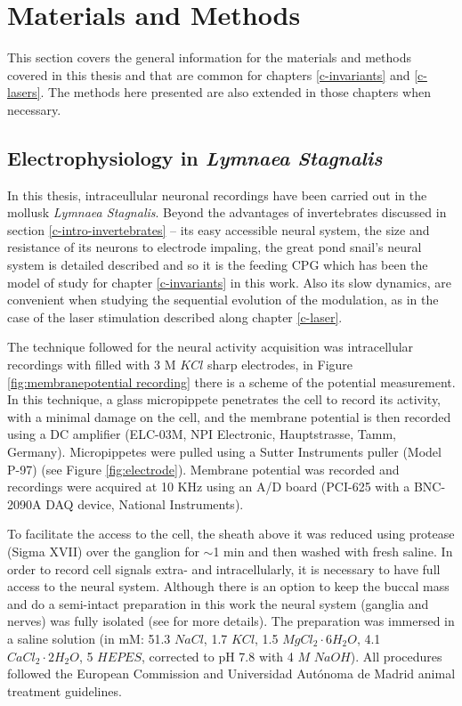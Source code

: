 \chapter{Materials and Methods}
This section covers the general information for the materials and methods covered in this thesis and that are common for chapters \ref{c-invariants} and \ref{c-lasers}. The methods here presented are also extended in those chapters when necessary.

\section{Electrophysiology in \textit{Lymnaea Stagnalis}}

\label{subsec:preparation}
In this thesis, intraceullular neuronal recordings have been carried out in the mollusk \textit{Lymnaea Stagnalis}. Beyond the advantages of invertebrates discussed in section \ref{c-intro-invertebrates} -- its easy accessible neural system, the size and resistance of its neurons to electrode impaling, the great pond snail's neural system is detailed described and so it is the feeding CPG which has been the model of study for chapter \ref{c-invariants} in this work. Also its slow dynamics, are convenient when studying the sequential evolution of the modulation, as in the case of the laser stimulation described along chapter \ref{c-laser}. 

The technique followed for the neural activity acquisition was intracellular recordings with filled with 3 M $KCl$ sharp electrodes, in Figure \ref{fig:membranepotential recording} there is a scheme of the potential measurement. In this technique, a glass micropippete penetrates the cell to record its activity, with a minimal damage on the cell, and the membrane potential is then recorded using a DC amplifier (ELC-03M, NPI Electronic, Hauptstrasse, Tamm, Germany). Micropippetes were pulled using a Sutter Instruments puller (Model P-97) (see Figure \ref{fig:electrode}). Membrane potential was recorded and recordings were acquired at 10 KHz using an A/D board (PCI-625 with a BNC-2090A DAQ device, National Instruments).

To facilitate the access to the cell, the sheath above it was reduced using protease (Sigma XVII) over the ganglion for $\sim$1 min and then washed with fresh saline. In order to record cell signals extra- and intracellularly, it is necessary to have full access to the neural system. Although there is an option to keep the buccal mass and do a semi-intact preparation \parencite{Staras1999} in this work the neural system (ganglia and nerves) was fully isolated (see \cite{garrido-pena_tfm_2022} for more details). The preparation was immersed in a saline solution (in mM: 51.3 $NaCl$, 1.7 $KCl$, 1.5 $MgCl_2\cdot6H_2O$, 4.1 $CaCl_2\cdot2H_2O$, 5 $HEPES$, corrected to pH 7.8 with 4 $M$ $NaOH$). All procedures followed the European Commission and Universidad Autónoma de Madrid animal treatment guidelines. 

